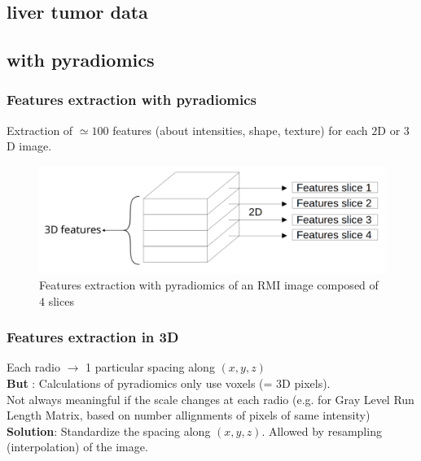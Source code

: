 \documentclass{beamer}
\begin{document}
\begin{frame}
    \section{liver tumor data}
    \subsection{with pyradiomics}
\end{frame}

\begin{frame}
    \frametitle{Features extraction with pyradiomics \cite{pyradio}}
    Extraction of $\simeq  100$ features (about intensities, shape, texture) for each $2$D or $3$D image.\\[10 pt]
    \begin{figure}
        \centering
        \includegraphics[scale = 0.15]{images/features.png}
        \caption{Features extraction with pyradiomics of an RMI image composed of $4$ slices}
    \end{figure}
\end{frame}

\begin{frame}
    \frametitle{Features extraction in 3D}
    Each radio $\rightarrow$ 1 particular spacing along $(x,y,z)$\\[10 pt]
    \textbf{But} : Calculations of pyradiomics only use voxels (= 3D pixels).\\[10 pt]
    Not always meaningful if the scale changes at each radio (e.g. for Gray Level Run Length Matrix, based on number allignments of pixels of same intensity)\\[10 pt]
    \textbf{Solution}: Standardize the spacing along $(x,y,z)$. Allowed by resampling (interpolation) of the image.
\end{frame}
\end{document}
